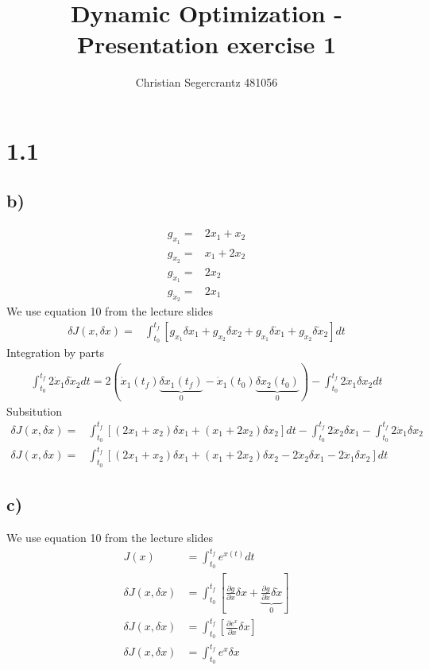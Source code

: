 \documentclass{article}
\title{Dynamic Optimization - Presentation exercise 1}
\author{Christian Segercrantz 481056}
\begin{document}
	\maketitle
	\pagebreak

\section*{1.1}
\subsection*{b)}
	
	\begin{align}
		g_{x_1} =& 2x_1 + x_2 \\
		g_{x_2} =& x_1+2x_2 \\
		g_{\dot{x}_1} =& 2x_2\\
		g_{\dot{x}_2} =& 2x_1
	\end{align}
	We use equation 10 from the lecture slides
	\begin{align}
		\delta J (x,\delta x) =& \int_{t_0}^{t_f}\left[g_{x_1}\delta x_1 + g_{x_2}\delta x_2 + g_{\dot{x}_1}\delta \dot{x}_1 + g_{\dot{x}_2}\delta \dot{x}_2 \right] dt
	\end{align}
	Integration by parts
	\begin{align}
		\int_{t_0}^{t_f} 2\dot{x}_1 \delta \dot{x}_2 dt = 2\left(\dot{x}_1(t_f)\underbrace{\delta x_1(t_f)}_{0}- \dot{x}_1(t_0) \underbrace{\delta x_2(t_0)}_{0} \right) - \int_{t_0}^{t_f} 2 \ddot{x}_1 \delta x_2 dt
	\end{align}
	Subsitution
	\begin{align}
		\delta J(x, \delta x) = & \int_{t_0}^{t_f} \left[ (2x_1+x_2) \delta x_1 + (x_1 +2x_2) \delta x_2 \right] dt - \int_{t_0}^{t_f} 2 \ddot{x}_2 \delta x_1  - \int_{t_0}^{t_f} 2 \ddot{x}_1 \delta x_2\\
		\delta J(x, \delta x) = & \int_{t_0}^{t_f} \left[ (2x_1+x_2) \delta x_1 + (x_1 +2x_2) \delta x_2 - 2\ddot{x}_2 \delta x_1 - 2 \ddot{x}_1 \delta x_2 \right] dt
	\end{align}
\pagebreak
\subsection*{c)}
	We use equation 10 from the lecture slides
	\begin{align}
		J(x) &= \int_{t_0}^{t_f} e^{x(t)}dt\\
		\delta J(x,\delta x) &= \int_{t_0}^{t_f} \left[ \frac{\partial g}{\partial x}\delta x + \underbrace{\frac{\partial g}{\partial \dot{x}}\delta \dot{x}}_{0}\right]\\
		\delta J(x,\delta x) &= \int_{t_0}^{t_f} \left[ \frac{\partial e^{x}}{\partial x}\delta x\right]	\\
		\delta J(x,\delta x) &= \int_{t_0}^{t_f}  e^{x}\delta x
	\end{align}
\end{document}
